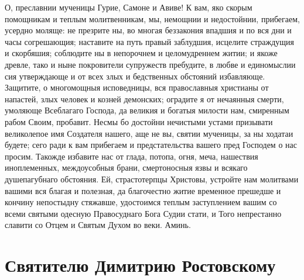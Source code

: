 

О, преславнии мученицы Гурие, Самоне и Авиве! К вам, яко скорым помощникам и теплым молитвенникам, мы, немощнии и недостойнии, прибегаем, усердно моляще: не презрите ны, во многая беззакония впадшия и по вся дни и часы согрешающия; наставите на путь правый заблудшия, исцелите страждущия и скорбяшия; соблюдите ны в непорочнем и целомудреннем житии; и якоже древле, тако и ныне покровители супружеств пребудите, в любве и единомыслии сия утверждающе и от всех злых и бедственных обстояний избавляюще. Защитите, о многомощныя исповедницы, вся православныя христианы от напастей, злых человек и козней демонских; оградите я от нечаянныя смерти, умоляюще Всеблагаго Господа, да великия и богатыя милости нам, смиренным рабом Своим, пробавит. Несмы бо достойни нечистыми устами призывати великолепое имя Создателя нашего, аще не вы, святии мученицы, за ны ходатаи будете; сего ради к вам прибегаем и предстательства вашего пред Господем о нас просим. Такожде избавите нас от глада, потопа, огня, меча, нашествия иноплеменных, междоусобныя брани, смертоносныя язвы и всякаго душепагубнаго обстояния. Ей, страстотерпцы Христовы, устройте нам молитвами вашими вся благая и полезная, да благочестно житие временное прешедше и кончину непостыдну стяжавше, удостоимся теплым заступлением вашим со всеми святыми одесную Правосуднаго Бога Судии стати, и Того непрестанно славити со Отцем и Святым Духом во веки. Аминь.
\mychapterending


 

\section{Святителю Димитрию Ростовскому}
 



